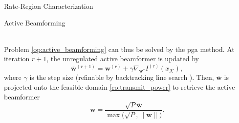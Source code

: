 \documentclass[journal]{IEEEtran}
\begin{document}
\begin{section}{Rate-Region Characterization}
\begin{subsection}{Active Beamforming}
\begin{figure*}[!b]
\begin{align}
				\label{eq:weighted_sum_mutual_information_gradient}
			\end{align}
		\end{figure*}
		Problem \eqref{op:active_beamforming} can thus be solved by the \gls{pga} method.
		At iteration $r+1$, the unregulated active beamformer is updated by
		\begin{equation}
			\bar{\boldsymbol{w}}^{(r+1)} = \boldsymbol{w}^{(r)}+\gamma\nabla_{\boldsymbol{w}^*} I^{(r)}(x_{\mathcal{K}}),
			\label{eq:beamforming_gradient_ascent}
		\end{equation}
		where $\gamma$ is the step size (refinable by backtracking line search \cite[Section 9.2]{Boyd2004}).
		Then, $\bar{\boldsymbol{w}}$ is projected onto the feasible domain \eqref{co:transmit_power} to retrieve the active beamformer
		\begin{equation}
			\boldsymbol{w} = \frac{\sqrt{P} \bar{\boldsymbol{w}}}{\max\bigl(\sqrt{P},\lVert\bar{\boldsymbol{w}}\rVert\bigr)}.
			\label{eq:beamforming_projection}
		\end{equation}


\end{subsection}
\end{section}
\end{document}
